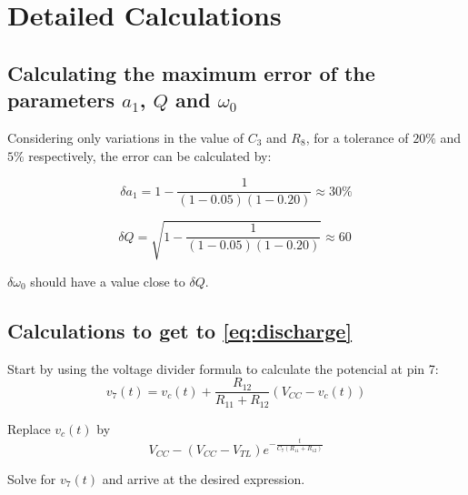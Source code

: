 \documentclass[lettersize,journal]{IEEEtran}
\begin{document}
\section{Detailed Calculations}
\label{appendix:calculations}
\subsection{Calculating the maximum error of the parameters $a_1$, $Q$ and $\omega_0$}
Considering only variations in the value of $C_3$ and $R_8$, for a tolerance of $20\%$ and $5\%$ respectively, the error can be calculated by:

\begin{equation}
    \delta a_1 = 1 - \frac{1}{(1 - 0.05)(1 - 0.20)} \approx 30\% \nonumber
\end{equation}

\begin{equation}
    \delta Q = \sqrt{1 - \frac{1}{(1 - 0.05)(1 - 0.20)}} \approx 60\ \nonumber
\end{equation}

$\delta \omega_0$ should have a value close to $\delta Q$.

\subsection{Calculations to get to \ref{eq:discharge}}

Start by using the voltage divider formula to calculate the potencial at pin 7:
\begin{equation}
    v_7(t) = v_c(t) + \frac{R_{12}}{R_{11} + R_{12}} \left( V_{CC} - v_c(t) \right) \nonumber 
\end{equation}

Replace $v_c(t)$ by 
\begin{equation}
   V_{CC} - (V_{CC} - V_{TL}) e^{-\frac{t}{C_7(R_{11} + R_{12})}} \nonumber
\end{equation}

Solve for $v_7(t)$ and arrive at the desired expression.
\end{document}

